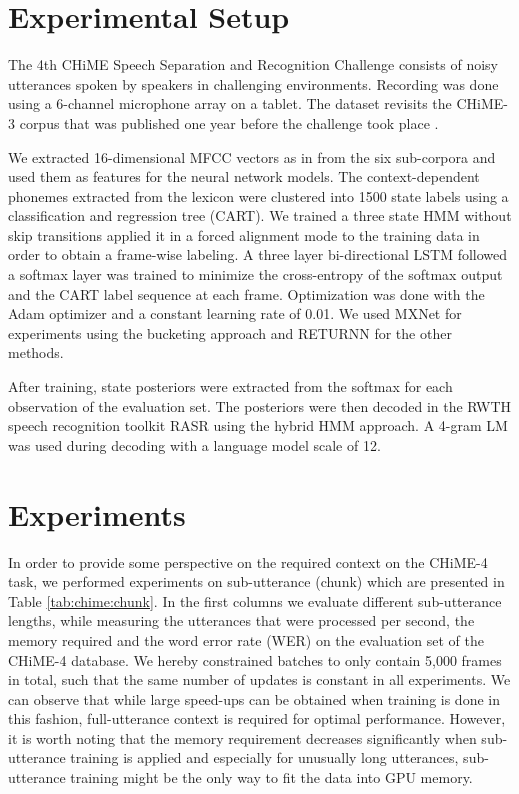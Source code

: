 \documentclass{article}
\begin{document}
  \section{Experimental Setup} \label{sec:setup}
  The 4th CHiME Speech Separation and Recognition Challenge
  \cite{Vincent_CSL2016:CHiME4} consists of noisy utterances spoken by speakers in challenging 
  environments. Recording was done using a 6-channel microphone array on a tablet. The dataset revisits 
  the CHiME-3 corpus that was published one year before the challenge took place \cite{Barker2015:CHiME3}.
  
  We extracted 16-dimensional MFCC vectors as in \cite{menne16:chime4System} from the six sub-corpora
  and used them as features for the neural network models. The context-dependent phonemes extracted from the lexicon were clustered into 
  1500 state labels using a classification and regression tree (CART).
  We trained a three state HMM without skip transitions applied it in a forced alignment mode to the training data in order to obtain a frame-wise labeling. A three layer 
  bi-directional LSTM followed a softmax layer was trained to minimize the cross-entropy of the softmax output and the CART label sequence at each frame. Optimization was done with the Adam optimizer and a constant learning rate of 0.01. We used MXNet \cite{mxnet} for experiments using the bucketing approach and RETURNN \cite{doetsch2017:returnn} for the other methods.  
  
  After training, state posteriors were extracted from the softmax for each observation of the evaluation set. The posteriors were then decoded in the RWTH 
  speech recognition toolkit RASR \cite{rybach2011:rasr} using the hybrid HMM approach. A 4-gram LM 
  was used during decoding with a language model scale of 12.

  \section{Experiments} \label{sec:experiments}
   In order to provide some perspective on the required context on the CHiME-4 task, 
   we performed experiments on sub-utterance (chunk) which are presented in 
   Table \ref{tab:chime:chunk}. In the first columns we evaluate different sub-utterance lengths, while measuring the utterances that were processed per second, the memory required and the word error rate (WER) on the evaluation set of the CHiME-4 database. We hereby constrained batches to only 
   contain 5,000 frames in total, such that the same number of updates is constant in all experiments. We can observe that 
   while large speed-ups can be obtained when training is done in this fashion, full-utterance context is
   required for optimal performance. However, it is worth noting that the memory requirement decreases 
   significantly when sub-utterance training is applied and especially for unusually long utterances, 
   sub-utterance training might be the only way to fit the data into GPU memory.
   
\end{document}
